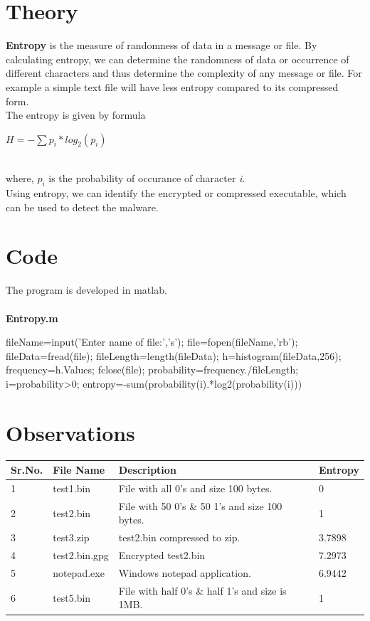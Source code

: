 \documentclass[oneside,a4paper,12pt]{report}
\begin{document}
\chapter{Theory}
\textbf{Entropy} is the measure of randomness of data in a message or file. By calculating entropy, we can determine the randomness of data or occurrence of different characters and thus determine the complexity of any message or file. For example a simple text file will have less entropy compared to its compressed form.\\
The entropy is given by formula\\

\begin{center}
{\huge \textbf{$H=-\sum p_{i}* log_{2}(p_{i}) $}}
\end{center}
\ \\ where, \textit{$p_{i}$} is the probability of occurance of character \textit{i}.
\ \\ Using entropy, we can identify the encrypted or compressed executable, which can be used to detect the malware.
\chapter{Code}
The program is developed in matlab.
\\ \\
\textbf{Entropy.m}
\begin{code}
fileName=input('Enter name of file:','s');
file=fopen(fileName,'rb');
fileData=fread(file);
fileLength=length(fileData);
h=histogram(fileData,256);
frequency=h.Values;
fclose(file);
probability=frequency./fileLength;
i=probability>0;
entropy=-sum(probability(i).*log2(probability(i)))
\end{code}

\chapter{Observations}
\begin{tabular}{|l| l | l | l |}
\hline
\textbf{Sr.No.} & \textbf{File Name} & \textbf{Description} & \textbf{Entropy} \\ \hline
1 & test1.bin & File with all 0's and size 100 bytes. & 0\\ \hline
2 & test2.bin & File with 50 0's \& 50 1's and size 100 bytes. & 1\\ \hline
3 & test3.zip & test2.bin compressed to zip. & 3.7898\\ \hline
4 & test2.bin.gpg & Encrypted test2.bin & 7.2973\\ \hline
5 & notepad.exe & Windows notepad application. & 6.9442\\ \hline
6 & test5.bin & File with half 0's \& half 1's and size is 1MB. & 1\\ \hline
\end{tabular}
\end{document}
